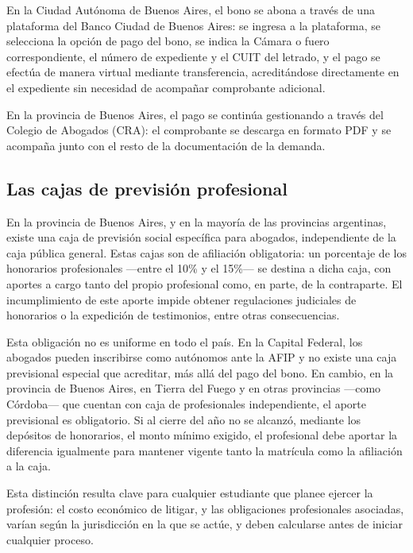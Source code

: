 \documentclass[12pt,oneside]{book}
\begin{document}
En la Ciudad Autónoma de Buenos Aires, el bono se abona a través de una plataforma del Banco Ciudad de Buenos Aires: se ingresa a la plataforma, se selecciona la opción de pago del bono, se indica la Cámara o fuero correspondiente, el número de expediente y el CUIT del letrado, y el pago se efectúa de manera virtual mediante transferencia, acreditándose directamente en el expediente sin necesidad de acompañar comprobante adicional.

\begin{note}
En la provincia de Buenos Aires, el pago se continúa gestionando a través del Colegio de Abogados (CRA): el comprobante se descarga en formato PDF y se acompaña junto con el resto de la documentación de la demanda.
\end{note}

\subsection{Las cajas de previsión profesional}

En la provincia de Buenos Aires, y en la mayoría de las provincias argentinas, existe una caja de previsión social específica para abogados, independiente de la caja pública general. Estas cajas son de afiliación obligatoria: un porcentaje de los honorarios profesionales —entre el 10\% y el 15\%— se destina a dicha caja, con aportes a cargo tanto del propio profesional como, en parte, de la contraparte. El incumplimiento de este aporte impide obtener regulaciones judiciales de honorarios o la expedición de testimonios, entre otras consecuencias.

\begin{important}
Esta obligación no es uniforme en todo el país. En la Capital Federal, los abogados pueden inscribirse como autónomos ante la AFIP y no existe una caja previsional especial que acreditar, más allá del pago del bono. En cambio, en la provincia de Buenos Aires, en Tierra del Fuego y en otras provincias —como Córdoba— que cuentan con caja de profesionales independiente, el aporte previsional es obligatorio. Si al cierre del año no se alcanzó, mediante los depósitos de honorarios, el monto mínimo exigido, el profesional debe aportar la diferencia igualmente para mantener vigente tanto la matrícula como la afiliación a la caja.
\end{important}

Esta distinción resulta clave para cualquier estudiante que planee ejercer la profesión: el costo económico de litigar, y las obligaciones profesionales asociadas, varían según la jurisdicción en la que se actúe, y deben calcularse antes de iniciar cualquier proceso.
\end{document}

